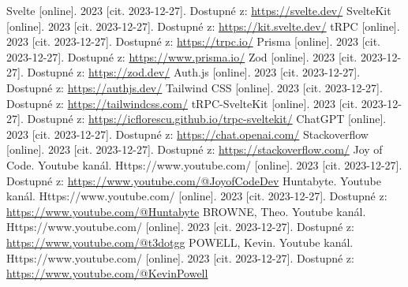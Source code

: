 \documentclass[12pt, a4paper,
openright
]{report}
\begin{document}
	\begin{thebibliography}{99}
		
		 Svelte [online]. 2023 [cit. 2023-12-27]. Dostupné z: \url{https://svelte.dev/}
		 SvelteKit [online]. 2023 [cit. 2023-12-27]. Dostupné z:  \url{https://kit.svelte.dev/}
		 tRPC [online]. 2023 [cit. 2023-12-27]. Dostupné z: \url{https://trpc.io/}
		 Prisma [online]. 2023 [cit. 2023-12-27]. Dostupné z: \url{https://www.prisma.io/}
		 Zod [online]. 2023 [cit. 2023-12-27]. Dostupné z: \url{https://zod.dev/}
		 Auth.js [online]. 2023 [cit. 2023-12-27]. Dostupné z: \url{https://authjs.dev/}
		 Tailwind CSS [online]. 2023 [cit. 2023-12-27]. Dostupné z: \url{https://tailwindcss.com/}
		 tRPC-SvelteKit [online]. 2023 [cit. 2023-12-27]. Dostupné z: \url{https://icflorescu.github.io/trpc-sveltekit/}
		 ChatGPT [online]. 2023 [cit. 2023-12-27]. Dostupné z: \url{https://chat.openai.com/}
		 Stackoverflow [online]. 2023 [cit. 2023-12-27]. Dostupné z: \url{https://stackoverflow.com/}
		Joy of Code. Youtube kanál. Https://www.youtube.com/ [online]. 2023 [cit. 2023-12-27]. Dostupné z: \url{https://www.youtube.com/@JoyofCodeDev}
		Huntabyte. Youtube kanál. Https://www.youtube.com/ [online]. 2023 [cit. 2023-12-27]. Dostupné z: \url{https://www.youtube.com/@Huntabyte}
		BROWNE, Theo. Youtube kanál. Https://www.youtube.com/ [online]. 2023 [cit. 2023-12-27]. Dostupné z: \url{https://www.youtube.com/@t3dotgg}
		POWELL, Kevin. Youtube kanál. Https://www.youtube.com/ [online]. 2023 [cit. 2023-12-27]. Dostupné z: \url{https://www.youtube.com/@KevinPowell}
		\
		
	\end{thebibliography}
	
	\listoffigures
	

	\appendix %
	
	[\vspace{-22pt}] %
	

	
\end{document}
